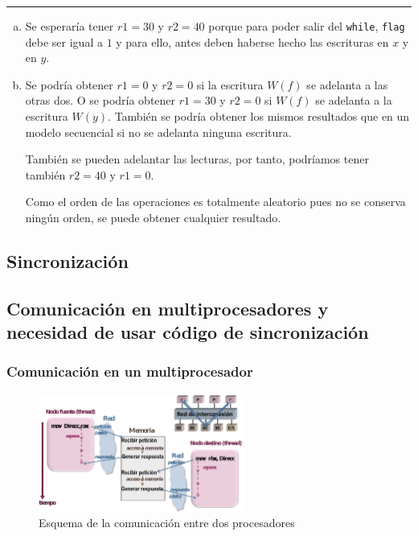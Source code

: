 \documentclass[10pt,a4paper,spanish]{report}
\begin{document}
\rule{\linewidth}{0.05mm}

\begin{enumerate}[a)]
    \item Se esperaría tener $r1=30$ y $r2=40$ porque para poder salir del \verb*|while|, \verb*|flag| debe ser igual a $1$ y para ello, antes deben haberse hecho las escrituras en $x$ y en $y$.
    \item Se podría obtener $r1=0$ y $r2=0$ si la escritura $W(f)$ se adelanta a las otras dos. O se podría obtener $r1=30$ y $r2=0$ si $W(f)$ se adelanta a la escritura $W(y)$. También se podría obtener los mismos resultados que en un modelo secuencial si no se adelanta ninguna escritura.

    También se pueden adelantar las lecturas, por tanto, podríamos tener también $r2=40$ y $r1=0$. 

    Como el orden de las operaciones es totalmente aleatorio pues no se conserva ningún orden, se puede obtener cualquier resultado.
\end{enumerate}

\textcolor[rgb]{0.2,0.4,0.8}{\section{Sincronización}}
\textcolor[rgb]{0.2,0.4,0.8}{\subsection{Comunicación en multiprocesadores y necesidad de usar código de sincronización}}
\textcolor[rgb]{0.2,0.4,0.8}{\subsubsection{Comunicación en un multiprocesador}}
\begin{figure}[!h]
\centering
\includegraphics[width=0.6\textwidth]{78}
\caption{Esquema de la comunicación entre dos procesadores}
\label{comunicacion_procesadores}
\end{figure}
\end{document}
